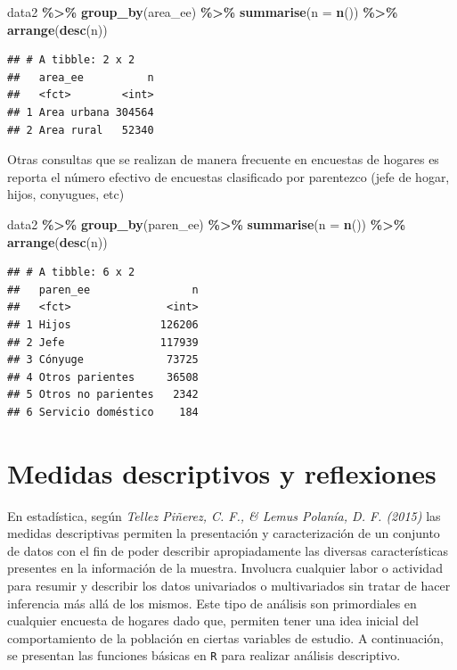 \documentclass[
  spanish,
  12pt,
]{book}
\newenvironment{Shaded}{\begin{snugshade}}{\end{snugshade}}
\newcommand{\AttributeTok}[1]{\textcolor[rgb]{0.13,0.29,0.53}{#1}}
\newcommand{\FunctionTok}[1]{\textcolor[rgb]{0.13,0.29,0.53}{\textbf{#1}}}
\newcommand{\NormalTok}[1]{#1}
\newcommand{\SpecialCharTok}[1]{\textcolor[rgb]{0.81,0.36,0.00}{\textbf{#1}}}
\begin{document}
\begin{Shaded}
\begin{Highlighting}[]
\NormalTok{data2 }\SpecialCharTok{\%\textgreater{}\%} 
  \FunctionTok{group\_by}\NormalTok{(area\_ee) }\SpecialCharTok{\%\textgreater{}\%} 
  \FunctionTok{summarise}\NormalTok{(}\AttributeTok{n =} \FunctionTok{n}\NormalTok{()) }\SpecialCharTok{\%\textgreater{}\%} \FunctionTok{arrange}\NormalTok{(}\FunctionTok{desc}\NormalTok{(n))}
\end{Highlighting}
\end{Shaded}

\begin{verbatim}
## # A tibble: 2 x 2
##   area_ee          n
##   <fct>        <int>
## 1 Area urbana 304564
## 2 Area rural   52340
\end{verbatim}

Otras consultas que se realizan de manera frecuente en encuestas de hogares es reporta el número efectivo de encuestas clasificado por parentezco (jefe de hogar, hijos, conyugues, etc)

\begin{Shaded}
\begin{Highlighting}[]
\NormalTok{data2 }\SpecialCharTok{\%\textgreater{}\%} 
  \FunctionTok{group\_by}\NormalTok{(paren\_ee) }\SpecialCharTok{\%\textgreater{}\%} 
  \FunctionTok{summarise}\NormalTok{(}\AttributeTok{n =} \FunctionTok{n}\NormalTok{()) }\SpecialCharTok{\%\textgreater{}\%} \FunctionTok{arrange}\NormalTok{(}\FunctionTok{desc}\NormalTok{(n)) }
\end{Highlighting}
\end{Shaded}

\begin{verbatim}
## # A tibble: 6 x 2
##   paren_ee                n
##   <fct>               <int>
## 1 Hijos              126206
## 2 Jefe               117939
## 3 Cónyuge             73725
## 4 Otros parientes     36508
## 5 Otros no parientes   2342
## 6 Servicio doméstico    184
\end{verbatim}

\section{Medidas descriptivos y reflexiones}\label{medidas-descriptivos-y-reflexiones}

En estadística, según \emph{Tellez Piñerez, C. F., \& Lemus Polanía, D. F. (2015)} las medidas descriptivas permiten la presentación y caracterización de un conjunto de datos con el fin de poder describir apropiadamente las diversas características presentes en la información de la muestra. Involucra cualquier labor o actividad para resumir y describir los datos univariados o multivariados sin tratar de hacer inferencia más allá de los mismos. Este tipo de análisis son primordiales en cualquier encuesta de hogares dado que, permiten tener una idea inicial del comportamiento de la población en ciertas variables de estudio. A continuación, se presentan las funciones básicas en \texttt{R} para realizar análisis descriptivo.
\end{document}
